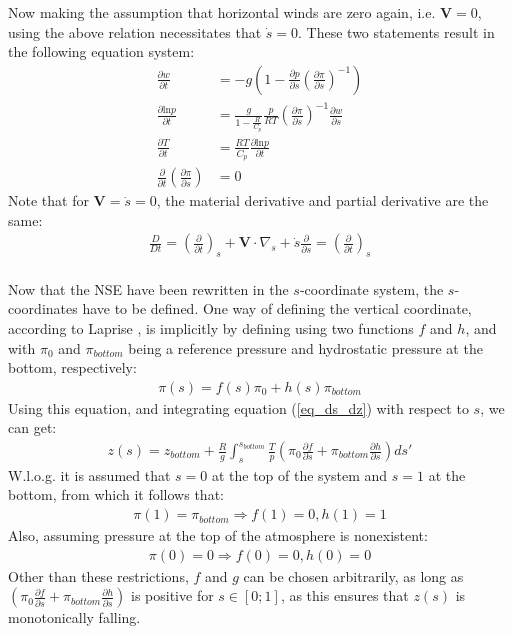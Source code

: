 Now making the assumption that horizontal winds are zero again, i.e. $\textbf{V}=0$, using the above relation necessitates that $\dot{s}=0$.
These two statements result in the following equation system:
\begin{align*}
\frac{\partial w}{\partial t} &= -g\left(1 - \frac{\partial p}{\partial s}\left(\frac{\partial \pi}{\partial s}\right)^{-1}\right) \\
\frac{\partial \text{ln}p}{\partial t} &= \frac{g}{1- \frac{R}{C_p}} \frac{p}{RT}\left(\frac{\partial \pi}{\partial s}\right)^{-1} \frac{\partial w}{\partial s}\\
\frac{\partial T}{\partial t} &= \frac{RT}{C_p}\frac{\partial \text{ln}p}{\partial t}\\
\frac{\partial}{\partial t}\left(\frac{\partial \pi}{\partial s}\right) &= 0
\end{align*}
Note that for $\textbf{V}=\dot{s}=0$, the material derivative and partial derivative are the same:
\begin{align*}
\frac{D}{Dt} = \left(\frac{\partial}{\partial t}\right)_s + \textbf{V} \cdot \nabla _s + \dot{s}\frac{\partial }{\partial s} = \left(\frac{\partial}{\partial t}\right)_s
\end{align*}
\\
Now that the NSE have been rewritten in the $s$-coordinate system, the $s$-coordinates have to be defined.
One way of defining the vertical coordinate, according to Laprise \cite{laprise1992euler}, is implicitly by defining using two functions $f$ and $h$, and with $\pi_0$ and $\pi _{bottom}$ being a reference pressure and hydrostatic pressure at the bottom, respectively:
\begin{align*}
\pi (s) = f(s)\pi_0 + h(s)\pi_{bottom}
\end{align*}
Using this equation, and integrating equation (\ref{eq_ds_dz}) with respect to $s$, we can get:
\begin{align*}
z(s) = z_{bottom} + \frac{R}{g}\int _s ^{s_{bottom}} \frac{T}{p}\left(\pi_0 \frac{\partial f}{\partial s} + \pi_{bottom} \frac{\partial h}{\partial s}\right)ds'
\end{align*}
W.l.o.g. it is assumed that $s=0$ at the top of the system and $s=1$ at the bottom, from which it follows that:
\begin{align*}
\pi(1) = \pi_{bottom} \Rightarrow f(1) = 0 , h(1) = 1
\end{align*}
Also, assuming pressure at the top of the atmosphere is nonexistent:
\begin{align*}
\pi(0) = 0 \Rightarrow f(0) = 0, h(0) = 0
\end{align*}
Other than these restrictions, $f$ and $g$ can be chosen arbitrarily, as long as $\left(\pi_0 \frac{\partial f}{\partial s} + \pi_{bottom} \frac{\partial h}{\partial s}\right)$ is positive for $s\in[0;1]$, as this ensures that $z(s)$ is monotonically falling.

